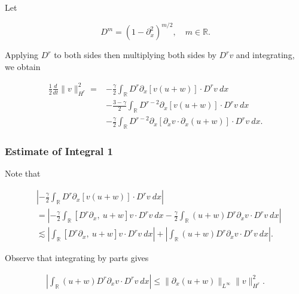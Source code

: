 \documentclass{beamer}
\numberwithin{equation}{section}
\newcommand{\rr}{\mathbb{R}}
\newcommand{\p}{\partial}
\begin{document}
\begin{frame}
Let

\begin{equation*}
    D^{m} = (1 - \p_x^2)^{m/2}, \quad m \in \rr.
\end{equation*}

Applying $D^r$ to both sides then 
multiplying both sides by $D^r v$ and integrating, we obtain


\begin{equation*}
\begin{split}
 \frac{1}{2} \frac{d}{dt} \|v\|_{H^r}^2
 = & -\frac{\gamma}{2} \int_{\rr} D^r \p_x [v(u+w)] \cdot
D^r v \ dx
\\
& - \frac{3-\gamma}{2} \int_{\rr}  D^{r -2}
\p_x[v(u+w)] \cdot
D^r v \ dx  
\\
& - \frac{\gamma}{2} \int_{\rr} D^{r 
-2} \p_x [ \p_x v
\cdot \p_x (u+w)]\cdot D^r v \ dx.
\label{2v}
\end{split}
\end{equation*}
\end{frame}


\begin{frame}
\frametitle{Estimate of Integral 1} Note that


\begin{equation*}
\begin{split}
& \left |  -\frac{\gamma}{2} \int_{\rr} D^r \p_x [v(u+w)] \cdot
D^r v \ dx \right |
\\
& =
\left |
-\frac{\gamma}{2} \int_{\rr} \left[ D^r \p_x, \ u+w \right]v \cdot
D^r v \ dx - \frac{\gamma}{2} \int_{\rr} (u+w) D^r
\p_x v \cdot D^r v\ dx
\right | \\
& \lesssim \left |
\int_{\rr} \left[ D^r \p_x, \ u+w \right]v \cdot
D^r v \ dx \right |
+ \left | \int_{\rr} (u+w) D^r \p_x v
\cdot D^r v\
dx \right |.
\label{4v}
\end{split}
\end{equation*}

\pause

Observe that integrating by parts gives


\begin{equation*}
\begin{split}
\left | \int_{\rr} (u+w) D^r \p_x v \cdot
D^r v \ dx \right |
\le \|\p_x (u+w)\|_{L^\infty}
\|v\|_{H^r}^2.
\label{4'v}
\end{split}
\end{equation*}




\end{frame}
\end{document}
